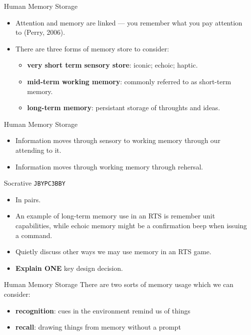 \begin{frame}{Human Memory Storage}
	\begin{itemize}
		\item Attention and memory are linked --- you remember what you pay attention to (Perry, 2006).
		\item There are three forms of memory store to consider:
		\begin{itemize}
			\item \textbf{very short term sensory store}: iconic; echoic; haptic.
			\item \textbf{mid-term working memory}: commonly referred to as short-term memory.
			\item \textbf{long-term memory}: persistant storage of throughts and ideas.
		\end{itemize}
	\end{itemize}
\end{frame}

\begin{frame}{Human Memory Storage}
	\begin{itemize}
		\item Information moves through sensory to working memory through our attending to it.
		\item Information moves through working memory through rehersal.
	\end{itemize}
\end{frame}

\begin{frame}[fragile]{Socrative \texttt{JBYPC3BBY}}
	\begin{itemize}
		\item In pairs.
		\item An example of long-term memory use in an RTS is remember unit capabilities, while echoic memory might be a confirmation beep when issuing a command.
		\item Quietly discuss other ways we may use memory in an RTS game.
		\item \textbf{Explain ONE} key design decision.
	\end{itemize}
\end{frame}

\begin{frame}{Human Memory Storage}
	There are two sorts of memory usage which we can consider:

	\begin{itemize}
		\item \textbf{recognition}: cues in the environment remind us of things
		\item \textbf{recall}: drawing things from memory without a prompt
	\end{itemize}
\end{frame}

